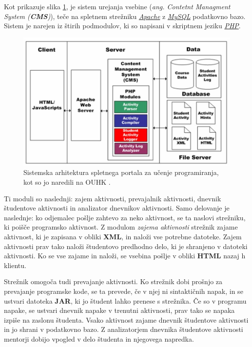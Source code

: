 Kot prikazuje slika \ref{fig:OUHK_cmsArch}, je sistem urejanja vsebine
(\emph{ang. Contetnt Managment System (\textbf{CMS})}), teče na
spletnem strežniku \emph{\href{http://www.apache.org/}{Apache}} z
\emph{\href{https://www.mysql.com/}{MySQL}} podatkovno bazo. Sistem je
narejen iz štirih podmodulov, ki so napisani v skriptnem jeziku
\emph{\href{http://php.net/}{PHP}}.

\begin{figure}[htb!] \centering
  \includegraphics[width=0.9\linewidth, keepaspectratio =
1]{./images/SystemArch01_OUHK_DistanceEdu.jpg}
  \caption{Sistemska arhitektura spletnega portala za učenje
    programiranja, kot so jo naredili na OUHK \cite{ITaLCP_DistanceEdu}.}
  \label{fig:OUHK_cmsArch}
\end{figure}

Ti moduli so naslednji: zajem aktivnosti, prevajalnik aktivnosti,
dnevnik študentove aktivnosti in analizator dnevnikov aktivnosti. Samo
delovanje je naslednje: ko odjemalec pošlje zahtevo za neko aktivnost,
se ta naslovi strežniku, ki poišče programsko aktivnost. Z modulom
\emph{zajema aktivnosti} strežnik zajame aktivnost, ki je zapisana v
obliki \textbf{XML}, in naloži vse potrebne datoteke. Zajem aktivnosti
prav tako naloži študentovo predhodno delo, ki je shranjeno v datoteki
aktivnosti. Ko se vse zajame in naloži, se vsebina pošlje v obliki
\textbf{HTML} nazaj h klientu.

Strežnik omogoča tudi prevajanje aktivnosti. Ko strežnik dobi prošnjo
za prevajanje programske kode, se ta prevede, če v njej ni
sintaktičnih napak, in se ustvari datoteka \textbf{JAR}, ki jo študent
lahko prenese s strežnika. Če so v programu napake, se ustvari dnevnik
napake v trenutni aktivnosti, prav tako se napaka izpiše na zaslonu
študenta. Vsako aktivnost zajame dnevnik študentove aktivnosti in jo shrani v
podatkovno bazo. Z analizatorjem dnevnika študentove aktivnosti
mentorji dobijo vpogled v delo študenta in njegovega napredka.

